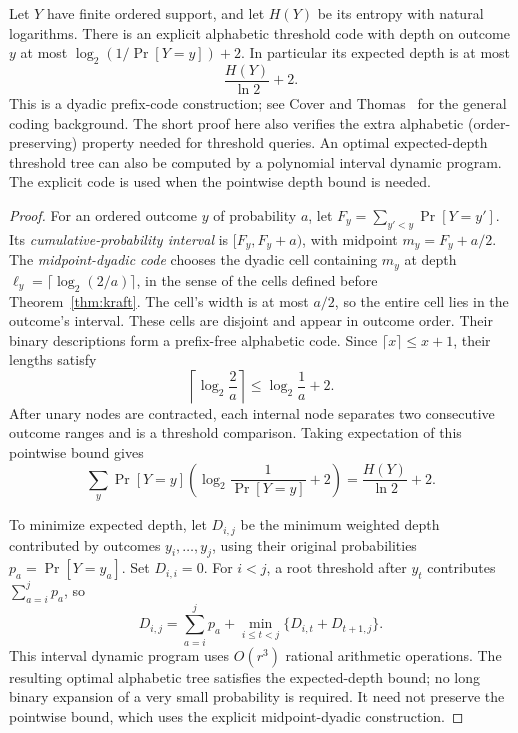 \begin{lemma}\label{lem:alphabetic-endpoints}
Let $Y$ have finite ordered support, and let $H(Y)$ be its entropy
with natural logarithms. There is an explicit alphabetic threshold
code with depth on outcome $y$ at most
$\log_2(1/\Pr[Y=y])+2$.
In particular its expected depth is at most
\[
 \frac{H(Y)}{\ln2}+2.
\]
This is a dyadic prefix-code construction; see Cover and
Thomas~\cite{ct2006} for the general coding background. The short
proof here also verifies the extra alphabetic (order-preserving)
property needed for threshold queries.
An optimal expected-depth threshold tree can also be computed by
a polynomial interval dynamic program. The explicit code is used
when the pointwise depth bound is needed.
\end{lemma}
\begin{proof}
For an ordered outcome $y$ of probability $a$, let
$F_y=\sum_{y'<y}\Pr[Y=y']$. Its \emph{cumulative-probability
interval} is $[F_y,F_y+a)$, with midpoint $m_y=F_y+a/2$.
The \emph{midpoint-dyadic code} chooses the dyadic cell containing
$m_y$ at depth $\ell_y=\lceil\log_2(2/a)\rceil$, in the sense
of the cells defined before Theorem~\ref{thm:kraft}.
The cell's width is at most $a/2$, so the entire cell lies in
the outcome's interval. These cells are disjoint and appear in
outcome order. Their binary descriptions form a prefix-free
alphabetic code. Since $\lceil x\rceil\le x+1$, their lengths
satisfy
\[
 \left\lceil\log_2\frac2a\right\rceil
 \le\log_2\frac1a+2.
\]
After unary nodes are contracted, each internal node separates
two consecutive outcome ranges and is a threshold comparison.
Taking expectation of this pointwise bound gives
\[
 \sum_y\Pr[Y=y]\left(\log_2\frac1{\Pr[Y=y]}+2\right)
 =\frac{H(Y)}{\ln2}+2.
\]

To minimize expected depth, let $D_{i,j}$ be the minimum weighted
depth contributed by outcomes $y_i,\ldots,y_j$, using their original
probabilities $p_a=\Pr[Y=y_a]$. Set $D_{i,i}=0$. For $i<j$, a root
threshold after $y_t$ contributes $\sum_{a=i}^j p_a$, so
\[
 D_{i,j}=\sum_{a=i}^j p_a+
       \min_{i\le t<j}\{D_{i,t}+D_{t+1,j}\}.
\]
This interval dynamic program uses $O(r^3)$ rational arithmetic
operations. The resulting optimal alphabetic tree satisfies the
expected-depth bound; no long binary expansion of a very small
probability is required. It need not preserve the pointwise bound,
which uses the explicit midpoint-dyadic construction.
\end{proof}



